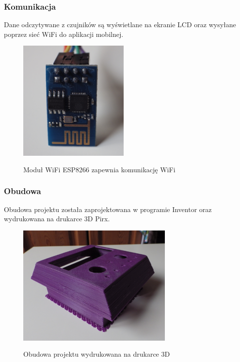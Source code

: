 \documentclass[12pt,a4paper]{article}
\begin{document}
\begin{enumerate}
\end{enumerate}
\subsubsection{Komunikacja}
Dane odczytywane z czujników są wyświetlane na ekranie LCD oraz wysyłane poprzez sieć WiFi do aplikacji mobilnej.
\begin{figure}[!h]	
\centering
	\includegraphics[height =60mm]{ESP8266.jpg}
	\label{ESP8266}
	\caption{Moduł WiFi ESP8266 zapewnia komunikację WiFi}
\end{figure}		

\subsubsection{Obudowa}
Obudowa projektu została zaprojektowana w programie Inventor oraz wydrukowana na drukarce 3D Pirx.
	\begin{figure}[!h]
	\centering
		\includegraphics[height =60mm]{obudowa.jpg}
		\label{elktro}
		\caption{Obudowa projektu wydrukowana na drukarce 3D}
	\end{figure}

\newpage
\end{document}
